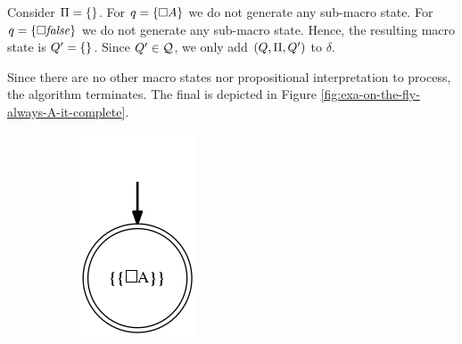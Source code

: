 \begin{example}
\begin{enumerate}
		Consider $\Pi = \{\}$. For $q = \{\Box A\}$ we do not generate any sub-macro state. For $q = \{\Box \mathit{false}\}$ we do not generate any sub-macro state.
		Hence, the resulting macro state is $Q' = \{\}$. Since $Q'\in \mathcal{Q}$, we only add $(Q, \Pi, Q')$ to $\delta$.
		 
		Since there are no other macro states nor propositional interpretation to process, the algorithm terminates. The final \DFA is depicted in Figure \ref{fig:exa-on-the-fly-always-A-it-complete}.
		
	\end{enumerate}

\begin{figure}[h]
	\centering
	\begin{subfigure}[b]{0.20\textwidth}
		\includegraphics[width=\textwidth]{images/on-the-fly-always-A-it-0}

\end{subfigure}
\end{figure}
\end{example}
